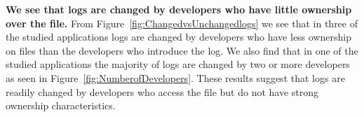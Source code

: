 \textbf{We see that logs are changed by developers who have little ownership over the file.} From Figure~\ref{fig:ChangedvsUnchangedlogs} we see that in three of the studied applications logs are changed by developers who have less ownership on files than the developers who introduce the log. We also find that in one of the studied applications the majority of logs are changed by two or more developers as seen in Figure~\ref{fig:NumberofDevelopers}. These results suggest that logs are readily changed by developers who access the file but do not have strong ownership characteristics.




%	
%	
%	
%	
%	
%	
%


